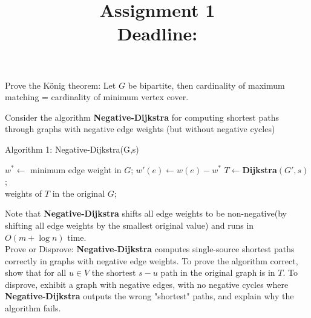 \documentclass{article}
\title{{\bf Assignment 1} \\ {\large Deadline: }}
\author{}
\date{}
\newcounter{exercise}
\newcommand{\<}{
    \langle}
\renewcommand{\>}{
    \rangle}
\begin{document}
\maketitle


{\large





\begin{exercise}
Prove the K\"onig theorem: Let $G$ be bipartite, then cardinality of maximum matching = cardinality of minimum vertex cover.
\end{exercise}


\begin{exercise}
Consider the algorithm \textbf{Negative-Dijkstra} for computing shortest paths through graphs with negative edge weights (but without negative cycles)
\begin{algorithm}[htb]
\caption{Algorithm 1: Negative-Dijkstra(G,s)}
\begin{algorithmic}[1]
\State $w^*\leftarrow$ minimum edge weight in $G$;
\State $w'(e)\leftarrow w(e)-w^*$
\EndFor
\State $T\leftarrow$\textbf{Dijkstra}$(G',s)$; \\
\Return weights of $T$ in the original $G$;
\end{algorithmic}
\end{algorithm}
Note that \textbf{Negative-Dijkstra} shifts all edge weights to be non-negative(by shifting all edge weights by the smallest original value) and runs in $O(m+\log n)$ time.\\
Prove or Disprove: \textbf{Negative-Dijkstra} computes single-source shortest paths correctly in graphs with negative edge weights. To prove the algorithm correct, show that for all $u\in V$ the shortest $s-u$ path in the original graph is in $T$. To disprove, exhibit a graph with negative edges, with no negative cycles where \textbf{Negative-Dijkstra} outputs the wrong "shortest" paths, and explain why the algorithm fails.
\end{exercise}


}
\end{document}
